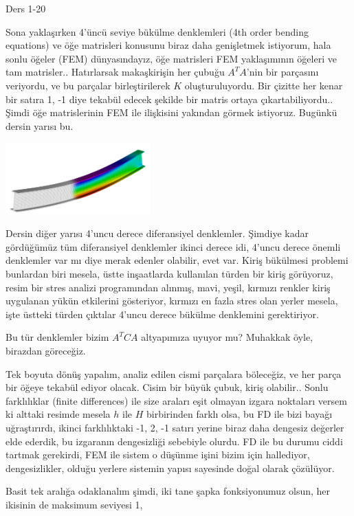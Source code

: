 \documentclass[12pt,fleqn]{article}\usepackage{../../common}
\begin{document}
Ders 1-20

Sona yaklaşırken 4'üncü seviye bükülme denklemleri (4th order bending equations)
ve öğe matrisleri konusunu biraz daha genişletmek istiyorum, hala sonlu öğeler
(FEM) dünyasındayız, öğe matrisleri FEM yaklaşımının öğeleri ve tam
matrisler.. Hatırlarsak makaşkirişin her çubuğu $A^T A$'nin bir parçasını
veriyordu, ve bu parçalar birleştirilerek $K$ oluşturuluyordu. Bir çizitte her
kenar bir satıra 1, -1 diye tekabül edecek şekilde bir matris ortaya
çıkartabiliyordu.. Şimdi öğe matrislerinin FEM ile ilişkisini yakından görmek
istiyoruz. Bugünkü dersin yarısı bu.

\includegraphics[width=15em]{compscieng_1_20_01.png}

Dersin diğer yarısı 4'uncu derece diferansiyel denklemler. Şimdiye kadar
gördüğümüz tüm diferansiyel denklemler ikinci derece idi, 4'uncu derece önemli
denklemler var mı diye merak edenler olabilir, evet var. Kiriş bükülmesi
problemi bunlardan biri mesela, üstte inşaatlarda kullanılan türden bir kiriş
görüyoruz, resim bir stres analizi programından alınmış, mavi, yeşil, kırmızı
renkler kiriş uygulanan yükün etkilerini gösteriyor, kırmızı en fazla stres olan
yerler mesela, işte üstteki türden çıktılar 4'uncu derece bükülme denklemini
gerektiriyor.

Bu tür denklemler bizim $A^T C A$ altyapımıza uyuyor mu? Muhakkak öyle,
birazdan göreceğiz. 

Tek boyuta dönüş yapalım, analiz edilen cismi parçalara böleceğiz, ve her parça
bir öğeye tekabül ediyor olacak. Cisim bir büyük çubuk, kiriş olabilir..  Sonlu
farklılıklar (finite differences) ile size araları eşit olmayan izgara noktaları
versem ki alttaki resimde mesela $h$ ile $H$ birbirinden farklı olsa, bu FD ile
bizi bayağı uğraştırırdı, ikinci farklılıktaki -1, 2, -1 satırı yerine biraz
daha dengesiz değerler elde ederdik, bu izgaranın dengesizliği sebebiyle
olurdu. FD ile bu durumu ciddi tartmak gerekirdi, FEM ile sistem o düşünme işini
bizim için hallediyor, dengesizlikler, olduğu yerlere sistemin yapısı
sayesinde doğal olarak çözülüyor. 

Basit tek aralığa odaklanalım şimdi, iki tane şapka fonksiyonumuz olsun, her
ikisinin de maksimum seviyesi 1,
\end{document}
